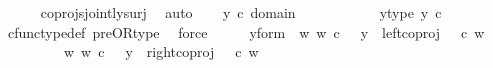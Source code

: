 \begin{isabellebody}
\ \ \ \ \isamarkupfalse%
\ coprojs{\isacharunderscore}{\kern0pt}jointly{\isacharunderscore}{\kern0pt}surj\ \isamarkupfalse%
\ auto\isanewline
\isanewline
\ \ \isamarkupfalse%
\ {\isachardoublequoteopen}y\ {\isasymin}\isactrlsub c\ domain\ {\isacharparenleft}{\kern0pt}{\isasymlangle}{\isasymt}{\isacharcomma}{\kern0pt}{\isasymt}{\isasymrangle}\ {\isasymamalg}\ {\isasymlangle}{\isasymt}{\isacharcomma}{\kern0pt}{\isasymf}{\isasymrangle}\ {\isasymamalg}\ {\isasymlangle}{\isasymf}{\isacharcomma}{\kern0pt}{\isasymt}{\isasymrangle}{\isacharparenright}{\kern0pt}{\isachardoublequoteclose}\ \isanewline
\ \ \isamarkupfalse%
\ \isamarkupfalse%
\ y{\isacharunderscore}{\kern0pt}type{\isacharcolon}{\kern0pt}\ {\isachardoublequoteopen}y\ {\isasymin}\isactrlsub c\ {\isacharparenleft}{\kern0pt}{\isasymone}{\isasymCoprod}{\isacharparenleft}{\kern0pt}{\isasymone}{\isasymCoprod}{\isasymone}{\isacharparenright}{\kern0pt}{\isacharparenright}{\kern0pt}{\isachardoublequoteclose}\ \ \isanewline
\ \ \ \ \isamarkupfalse%
\ cfunc{\isacharunderscore}{\kern0pt}type{\isacharunderscore}{\kern0pt}def\ pre{\isacharunderscore}{\kern0pt}OR{\isacharunderscore}{\kern0pt}type\ \isamarkupfalse%
\ force\isanewline
\ \ \isamarkupfalse%
\ \isamarkupfalse%
\ y{\isacharunderscore}{\kern0pt}form{\isacharcolon}{\kern0pt}\ {\isachardoublequoteopen}{\isacharparenleft}{\kern0pt}{\isasymexists}\ w{\isachardot}{\kern0pt}\ {\isacharparenleft}{\kern0pt}w\ {\isasymin}\isactrlsub c\ {\isasymone}\ {\isasymand}\ y\ {\isacharequal}{\kern0pt}\ {\isacharparenleft}{\kern0pt}left{\isacharunderscore}{\kern0pt}coproj\ {\isasymone}\ {\isacharparenleft}{\kern0pt}{\isasymone}{\isasymCoprod}{\isasymone}{\isacharparenright}{\kern0pt}{\isacharparenright}{\kern0pt}\ {\isasymcirc}\isactrlsub c\ w{\isacharparenright}{\kern0pt}{\isacharparenright}{\kern0pt}\isanewline
\ \ \ \ \ \ {\isasymor}\ \ {\isacharparenleft}{\kern0pt}{\isasymexists}\ w{\isachardot}{\kern0pt}\ {\isacharparenleft}{\kern0pt}w\ {\isasymin}\isactrlsub c\ {\isacharparenleft}{\kern0pt}{\isasymone}{\isasymCoprod}{\isasymone}{\isacharparenright}{\kern0pt}\ {\isasymand}\ y\ {\isacharequal}{\kern0pt}\ {\isacharparenleft}{\kern0pt}right{\isacharunderscore}{\kern0pt}coproj\ {\isasymone}\ {\isacharparenleft}{\kern0pt}{\isasymone}{\isasymCoprod}{\isasymone}{\isacharparenright}{\kern0pt}{\isacharparenright}{\kern0pt}\ {\isasymcirc}\isactrlsub c\ w{\isacharparenright}{\kern0pt}{\isacharparenright}{\kern0pt}{\isachardoublequoteclose}\isanewline

\end{isabellebody}
